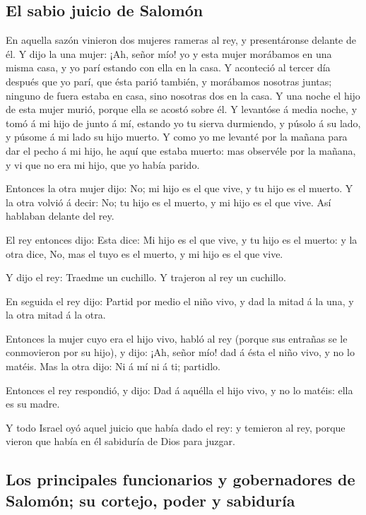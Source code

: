 \hypertarget{el-sabio-juicio-de-salomuxf3n}{%
\subsection{El sabio juicio de
Salomón}\label{el-sabio-juicio-de-salomuxf3n}}

 En aquella sazón vinieron dos mujeres rameras al rey, y
presentáronse delante de él.  Y dijo la una mujer: ¡Ah,
señor mío! yo y esta mujer morábamos en una misma casa, y yo parí
estando con ella en la casa.  Y aconteció al tercer día
después que yo parí, que ésta parió también, y morábamos nosotras
juntas; ninguno de fuera estaba en casa, sino nosotras dos en la casa.
 Y una noche el hijo de esta mujer murió, porque ella se
acostó sobre él.  Y levantóse á media noche, y tomó á mi
hijo de junto á mí, estando yo tu sierva durmiendo, y púsolo á su lado,
y púsome á mi lado su hijo muerto.  Y como yo me levanté
por la mañana para dar el pecho á mi hijo, he aquí que estaba muerto:
mas observéle por la mañana, y vi que no era mi hijo, que yo había
parido.

 Entonces la otra mujer dijo: No; mi hijo es el que vive,
y tu hijo es el muerto. Y la otra volvió á decir: No; tu hijo es el
muerto, y mi hijo es el que vive. Así hablaban delante del rey.

 El rey entonces dijo: Esta dice: Mi hijo es el que vive,
y tu hijo es el muerto: y la otra dice, No, mas el tuyo es el muerto, y
mi hijo es el que vive.

 Y dijo el rey: Traedme un cuchillo. Y trajeron al rey un
cuchillo.

 En seguida el rey dijo: Partid por medio el niño vivo, y
dad la mitad á la una, y la otra mitad á la otra.

 Entonces la mujer cuyo era el hijo vivo, habló al rey
(porque sus entrañas se le conmovieron por su hijo), y dijo: ¡Ah, señor
mío! dad á ésta el niño vivo, y no lo matéis. Mas la otra dijo: Ni á mí
ni á ti; partidlo.

 Entonces el rey respondió, y dijo: Dad á aquélla el hijo
vivo, y no lo matéis: ella es su madre.

 Y todo Israel oyó aquel juicio que había dado el rey: y
temieron al rey, porque vieron que había en él sabiduría de Dios para
juzgar.

\hypertarget{los-principales-funcionarios-y-gobernadores-de-salomuxf3n-su-cortejo-poder-y-sabiduruxeda}{%
\subsection{Los principales funcionarios y gobernadores de Salomón; su
cortejo, poder y
sabiduría}\label{los-principales-funcionarios-y-gobernadores-de-salomuxf3n-su-cortejo-poder-y-sabiduruxeda}}

